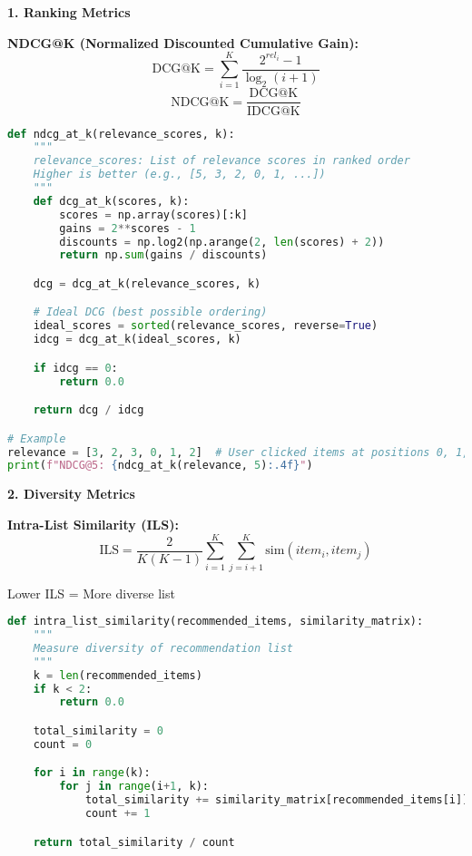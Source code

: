 \documentclass[10pt]{article}
\begin{document}
\textbf{1. Ranking Metrics}

\textbf{NDCG@K (Normalized Discounted Cumulative Gain):}
\begin{equation}
\text{DCG@K} = \sum_{i=1}^K \frac{2^{rel_i} - 1}{\log_2(i+1)}
\end{equation}
\begin{equation}
\text{NDCG@K} = \frac{\text{DCG@K}}{\text{IDCG@K}}
\end{equation}

\begin{lstlisting}[language=Python]
def ndcg_at_k(relevance_scores, k):
    """
    relevance_scores: List of relevance scores in ranked order
    Higher is better (e.g., [5, 3, 2, 0, 1, ...])
    """
    def dcg_at_k(scores, k):
        scores = np.array(scores)[:k]
        gains = 2**scores - 1
        discounts = np.log2(np.arange(2, len(scores) + 2))
        return np.sum(gains / discounts)

    dcg = dcg_at_k(relevance_scores, k)

    # Ideal DCG (best possible ordering)
    ideal_scores = sorted(relevance_scores, reverse=True)
    idcg = dcg_at_k(ideal_scores, k)

    if idcg == 0:
        return 0.0

    return dcg / idcg

# Example
relevance = [3, 2, 3, 0, 1, 2]  # User clicked items at positions 0, 1, 2, 5
print(f"NDCG@5: {ndcg_at_k(relevance, 5):.4f}")
\end{lstlisting}

\textbf{2. Diversity Metrics}

\textbf{Intra-List Similarity (ILS):}
\begin{equation}
\text{ILS} = \frac{2}{K(K-1)} \sum_{i=1}^K \sum_{j=i+1}^K \text{sim}(item_i, item_j)
\end{equation}

Lower ILS = More diverse list

\begin{lstlisting}[language=Python]
def intra_list_similarity(recommended_items, similarity_matrix):
    """
    Measure diversity of recommendation list
    """
    k = len(recommended_items)
    if k < 2:
        return 0.0

    total_similarity = 0
    count = 0

    for i in range(k):
        for j in range(i+1, k):
            total_similarity += similarity_matrix[recommended_items[i]][recommended_items[j]]
            count += 1

    return total_similarity / count
\end{lstlisting}
\end{document}
